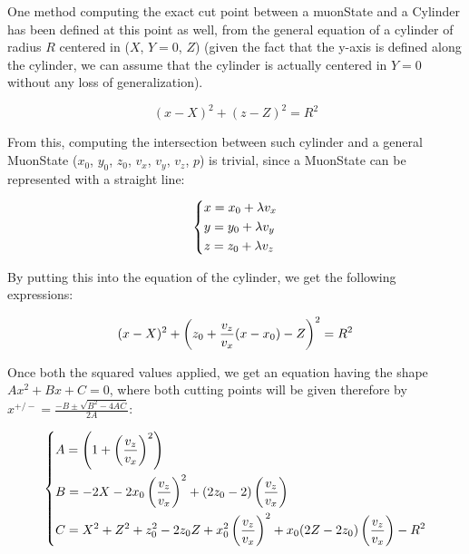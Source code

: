 \documentclass[a4paper, 11pt]{report}
\begin{document}
One method computing the exact cut point between a muonState and a Cylinder has been defined at this point as well, from the general equation of a cylinder of radius $R$ centered in ($X$, $Y = 0$, $Z$) (given the fact that the y-axis is defined along the cylinder, we can assume that the cylinder is actually centered in $Y = 0$ without any loss of generalization).

\begin{equation}
\label{eq:cylinder}
(x - X)^2 + (z - Z)^2 = R^2
\end{equation}

From this, computing the intersection between such cylinder and a general MuonState ($x_0$, $y_0$, $z_0$, $v_{x}$, $v_{y}$, $v_{z}$, $p$) is trivial, since a MuonState can be represented with a straight line: 

\begin{equation}
\label{eq:line}
\begin{dcases}
x = x_0 + \lambda v_x \\
y = y_0 + \lambda v_y \\
z = z_0 + \lambda v_z
\end{dcases}
\end{equation}

By putting this into the equation of the cylinder, we get the following expressions:

\begin{equation}
\label{eq:together}
(x - X)^2 + \left (z_0 + \frac{v_z}{v_x} (x - x_0) - Z \right )^2 = R^2 \\
\end{equation}

Once both the squared values applied, we get an equation having the shape $Ax^2 + Bx + C = 0$, where both cutting points will be given therefore by $x^{+/-} = \frac{-B \pm \sqrt{B^2 - 4 AC}}{2A}$:

\begin{equation}
\label{eq:lines}
\begin{dcases}
A = \left (1 + \left (\frac{v_z}{v_x} \right )^2 \right ) \\
B = -2X - 2 x_0 \left (\frac{v_z}{v_x} \right )^2 + (2 z_0 - 2) \left (\frac{v_z}{v_x} \right ) \\
C = X^2 + Z^2 + z_0^2 - 2 z_0 Z + x_0^2 \left (\frac{v_z}{v_x} \right )^2 + x_0 (2 Z - 2 z_0) \left (\frac{v_z}{v_x} \right ) - R^2
\end{dcases}
\end{equation}
\end{document}
